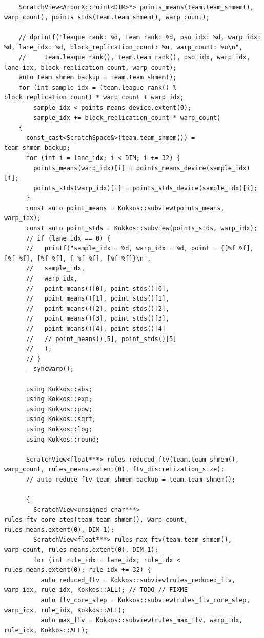 \begin{verbatim}
    ScratchView<ArborX::Point<DIM>*> points_means(team.team_shmem(), warp_count), points_stds(team.team_shmem(), warp_count);

    // dprintf("league_rank: %d, team_rank: %d, pso_idx: %d, warp_idx: %d, lane_idx: %d, block_replication_count: %u, warp_count: %u\n",
    //     team.league_rank(), team.team_rank(), pso_idx, warp_idx, lane_idx, block_replication_count, warp_count);
    auto team_shmem_backup = team.team_shmem();
    for (int sample_idx = (team.league_rank() % block_replication_count) * warp_count + warp_idx;
        sample_idx < points_means_device.extent(0);
        sample_idx += block_replication_count * warp_count)
    {
      const_cast<ScratchSpace&>(team.team_shmem()) = team_shmem_backup;
      for (int i = lane_idx; i < DIM; i += 32) {
        points_means(warp_idx)[i] = points_means_device(sample_idx)[i];
        points_stds(warp_idx)[i] = points_stds_device(sample_idx)[i];
      }
      const auto point_means = Kokkos::subview(points_means, warp_idx);
      const auto point_stds = Kokkos::subview(points_stds, warp_idx);
      // if (lane_idx == 0) {
      //   printf("sample_idx = %d, warp_idx = %d, point = {[%f %f], [%f %f], [%f %f], [ %f %f], [%f %f]}\n",
      //   sample_idx,
      //   warp_idx,
      //   point_means()[0], point_stds()[0], 
      //   point_means()[1], point_stds()[1],
      //   point_means()[2], point_stds()[2], 
      //   point_means()[3], point_stds()[3],
      //   point_means()[4], point_stds()[4]
      //   // point_means()[5], point_stds()[5]
      //   );
      // }
      __syncwarp();

      using Kokkos::abs;
      using Kokkos::exp;
      using Kokkos::pow;
      using Kokkos::sqrt;
      using Kokkos::log;
      using Kokkos::round;
      
      ScratchView<float***> rules_reduced_ftv(team.team_shmem(), warp_count, rules_means.extent(0), ftv_discretization_size);
      // auto reduce_ftv_team_shmem_backup = team.team_shmem();

      {
        ScratchView<unsigned char***> rules_ftv_core_step(team.team_shmem(), warp_count, rules_means.extent(0), DIM-1);
        ScratchView<float***> rules_max_ftv(team.team_shmem(), warp_count, rules_means.extent(0), DIM-1);
        for (int rule_idx = lane_idx; rule_idx < rules_means.extent(0); rule_idx += 32) {
          auto reduced_ftv = Kokkos::subview(rules_reduced_ftv, warp_idx, rule_idx, Kokkos::ALL); // TODO // FIXME
          auto ftv_core_step = Kokkos::subview(rules_ftv_core_step, warp_idx, rule_idx, Kokkos::ALL);
          auto max_ftv = Kokkos::subview(rules_max_ftv, warp_idx, rule_idx, Kokkos::ALL);


\end{verbatim}
